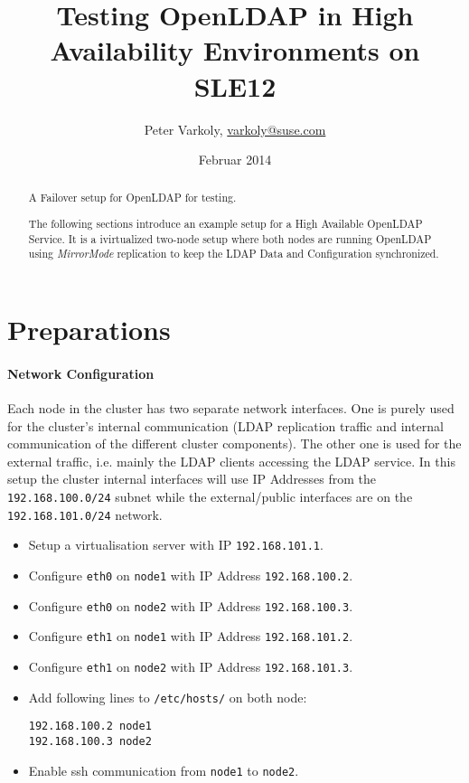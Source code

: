 \documentclass[a4paper,11pt,DIV=12]{scrartcl}
\title{Testing OpenLDAP in High Availability Environments on SLE12}
\author{Peter Varkoly, \href{mailto:varkoly@suse.com}{varkoly@suse.com}}
\date{Februar 2014}
\begin{document}
\maketitle

\begin{abstract}
    A Failover setup for OpenLDAP for testing.

    The following sections introduce an example setup for a High Available
    OpenLDAP Service. It is a ivirtualized two-node setup where both nodes
    are running OpenLDAP using \emph{MirrorMode} replication to keep the
    LDAP Data and Configuration synchronized. 
\end{abstract}

\section{Preparations}

\paragraph{Network Configuration}
    Each node in the cluster has two separate network interfaces. One is
    purely used for the cluster's internal communication (LDAP replication
    traffic and internal communication of the different cluster components).
    The other one is used for the external traffic, i.e. mainly the LDAP
    clients accessing the LDAP service. In this setup the cluster internal
    interfaces will use IP Addresses from the \verb|192.168.100.0/24| subnet
    while the external/public interfaces are on the  \verb|192.168.101.0/24|
    network.

    \begin{itemize}
       \item Setup a virtualisation server with IP \verb|192.168.101.1|.
       \item Configure \verb|eth0| on \verb|node1| with IP Address \verb|192.168.100.2|.
       \item Configure \verb|eth0| on \verb|node2| with IP Address \verb|192.168.100.3|.
       \item Configure \verb|eth1| on \verb|node1| with IP Address \verb|192.168.101.2|.
       \item Configure \verb|eth1| on \verb|node2| with IP Address \verb|192.168.101.3|.
       \item Add following lines to \verb|/etc/hosts/| on both node:
          \begin{verbatim}
192.168.100.2 node1
192.168.100.3 node2
          \end{verbatim}
       \item Enable ssh communication from \verb|node1| to \verb|node2|.  
    \end{itemize}
\end{document}
